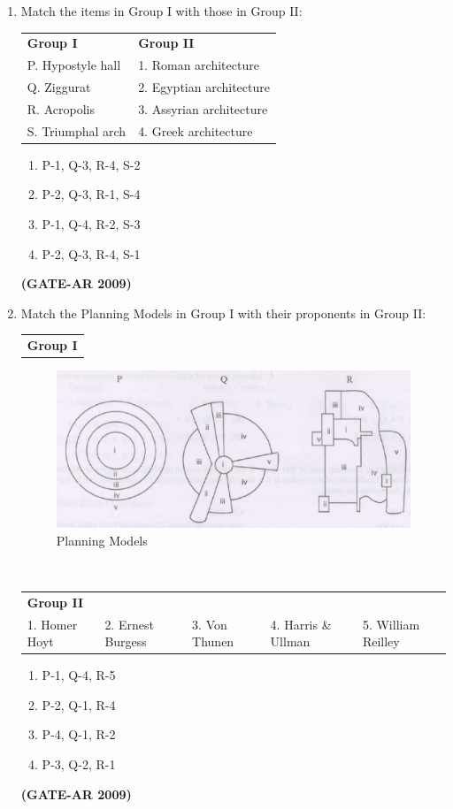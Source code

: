\documentclass[a4paper,10pt]{article}
\begin{document}
\begin{enumerate}
    \item Match the items in Group I with those in Group II:  \\
    \begin{tabular}{ l l }
	\textbf{Group I} & \textbf{Group II} \\
	P. Hypostyle hall & 1. Roman architecture \\
	Q. Ziggurat & 2. Egyptian architecture \\
	R. Acropolis & 3. Assyrian architecture \\
	S. Triumphal arch & 4. Greek architecture \\
	\end{tabular}
	\begin{multicols}{2}
	\begin{enumerate}
        \item P-1, Q-3, R-4, S-2
        \item P-2, Q-3, R-1, S-4
        \item P-1, Q-4, R-2, S-3
        \item P-2, Q-3, R-4, S-1
    \end{enumerate}
	\end{multicols}
    \hfill \textbf{(GATE-AR 2009)}

    \item Match the Planning Models in Group I with their proponents in Group II:  \\
    \begin{tabular}{ l }
	\textbf{Group I} \\
	\end{tabular}
	\begin{figure}[h!]
        \centering
        \includegraphics[width=0.5\linewidth]{figs/img_03.jpg}
	\caption{Planning Models}
	\end{figure} \\
    \begin{tabular}{ l l l l l }
	\textbf{Group II} & & \\
	1. Homer Hoyt & 2. Ernest Burgess & 3. Von Thunen & 4. Harris \& Ullman & 5. William Reilley \\
	\end{tabular}
	\begin{multicols}{2}
	\begin{enumerate}
        \item P-1, Q-4, R-5
        \item P-2, Q-1, R-4
        \item P-4, Q-1, R-2
        \item P-3, Q-2, R-1
    \end{enumerate}
	\end{multicols}
    \hfill \textbf{(GATE-AR 2009)}


\end{enumerate}
\end{document}
